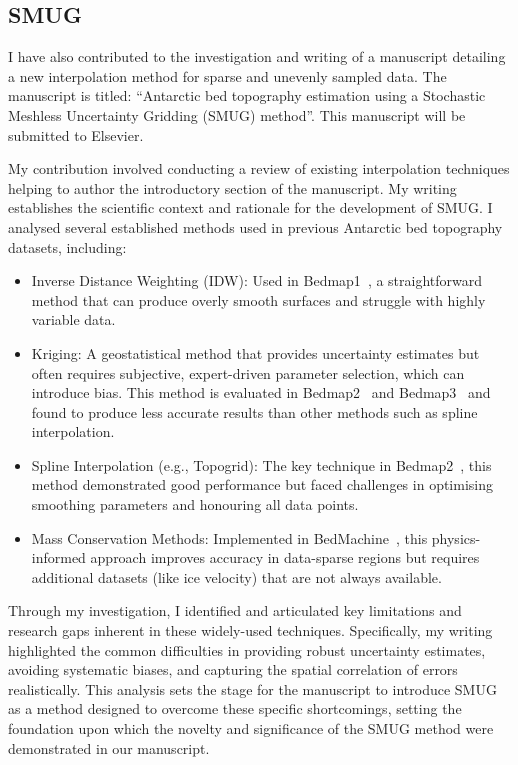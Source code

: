 \newpage
\subsection{SMUG}
I have also contributed to the investigation and writing of a manuscript detailing a new interpolation method for sparse and unevenly sampled data. The manuscript is titled: ``Antarctic bed topography estimation using a Stochastic Meshless Uncertainty Gridding (SMUG) method''. This manuscript will be submitted to Elsevier.

My contribution involved conducting a review of existing interpolation techniques helping to author the introductory section of the manuscript. My writing establishes the scientific context and rationale for the development of SMUG. I analysed several established methods used in previous Antarctic bed topography datasets, including:

\begin{itemize}
    \item{Inverse Distance Weighting (IDW)}: Used in Bedmap1~\cite{Lythe_2001}, a straightforward method that can produce overly smooth surfaces and struggle with highly variable data.

    \item{Kriging}: A geostatistical method that provides uncertainty estimates but often requires subjective, expert-driven parameter selection, which can introduce bias. This method is evaluated in Bedmap2~\cite{Fretwell_2013} and Bedmap3~\cite{Pritchard_2025} and found to produce less accurate results than other methods such as spline interpolation.

    \item{Spline Interpolation (e.g., Topogrid)}: The key technique in Bedmap2~\cite{Fretwell_2013}, this method demonstrated good performance but faced challenges in optimising smoothing parameters and honouring all data points.

    \item{Mass Conservation Methods}: Implemented in BedMachine~\cite{Morlighem_2020}, this physics-informed approach improves accuracy in data-sparse regions but requires additional datasets (like ice velocity) that are not always available.
\end{itemize}
Through my investigation, I identified and articulated key limitations and research gaps inherent in these widely-used techniques. Specifically, my writing highlighted the common difficulties in providing robust uncertainty estimates, avoiding systematic biases, and capturing the spatial correlation of errors realistically. This analysis sets the stage for the manuscript to introduce SMUG as a method designed to overcome these specific shortcomings, setting the foundation upon which the novelty and significance of the SMUG method were demonstrated in our manuscript.

